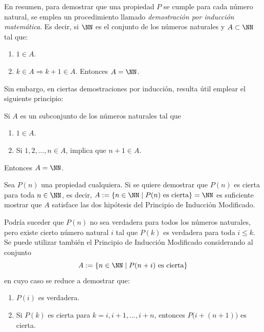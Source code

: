En resumen, para demostrar que una propiedad $P$ se cumple para cada número natural, se emplea un procedimiento llamado \emph{demostración por inducción matemática}. Es decir, si $\NN$ es el conjunto de los números naturales y $A \subset \NN$ tal que:
\begin{enumerate}[label=\roman*.]
    \item $1 \in A$.
    \item $k \in A \Longrightarrow k+1 \in A$. Entonces $A = \NN$.
\end{enumerate}

Sin embargo, en ciertas demostraciones por inducción, resulta útil emplear el siguiente principio:

\begin{tcolorbox}[
    theorem style=change apart,
    enhanced,
    lower separated=false,
    breakable,
    boxrule=0pt,
    frame hidden,
    colback=black!7!white,
    coltitle=black,
    boxed title style={colframe=white, colback=white, boxrule=0pt},
    fontupper=\normalsize,
    before upper={\abovedisplayskip=8pt\belowdisplayskip=8pt},
    left=1mm,
    right=1mm,
    top=1mm,
    bottom=1mm,
    sharp corners,
    overlay={
        \node[left, font=\bfseries\color{black}\fontencoding{T1}\fontfamily{phv}\selectfont,minimum width=2cm, anchor=east, xshift=-0.5\marginparsep, yshift=-0.348cm] at (frame.north west) {Inducción Modificado:};
    }
]
    Si $A$ es un subconjunto de los números naturales tal que
    \begin{enumerate}[label=\roman*., topsep=6pt, itemsep=0pt]
        \item $1 \in A$.
    \item Si $1, 2, \dots , n \in A$, implica que $n+1 \in A$.
    \end{enumerate}
    Entonces $A = \NN$.
\end{tcolorbox}

Sea $P(n)$ una propiedad cualquiera. Si se quiere demostrar que $P(n)$ es cierta para toda $n \in \NN$, es decir, $A:=\left\lbrace n \in \NN \mid P(n) \text{ es cierta} \right\rbrace = \NN$
es suficiente mostrar que $A$ satisface las dos hipótesis del Principio de Inducción Modificado.

\newpage

Podría suceder que $P(n)$ no sea verdadera para todos los números naturales, pero existe cierto número natural $i$ tal que $P(k)$ es verdadera para toda $i \leq k$. Se puede utilizar también el Principio de Inducción Modificado considerando al conjunto
$$A:=\left\lbrace n \in \NN \mid P(n+i) \text{ es cierta} \right\rbrace $$
en cuyo caso se reduce a demostrar que:
\begin{enumerate}[label=\roman*.]
    \item $P(i)$ es verdadera.
    \item Si $P(k)$ es cierta para $k=i, i+1, \dots, i+n$, entonces $P\big( i+(n+1) \big)$ es cierta.
\end{enumerate}

